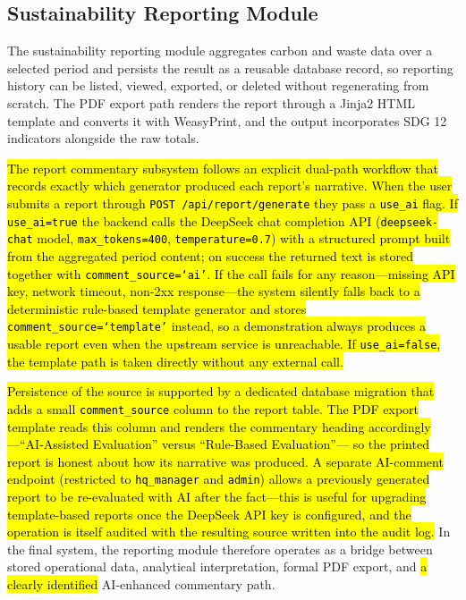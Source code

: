 \documentclass[11pt,a4paper]{article}
\newcommand{\new}[1]{\hl{#1}}
\begin{document}
\subsection{Sustainability Reporting Module}
The sustainability reporting module aggregates carbon and waste data over a selected period and persists the result as a reusable database record, so reporting history can be listed, viewed, exported, or deleted without regenerating from scratch. The PDF export path renders the report through a Jinja2 HTML template and converts it with WeasyPrint, and the output incorporates SDG 12 indicators alongside the raw totals.

\new{The report commentary subsystem follows an explicit dual-path workflow that records exactly which generator produced each report's narrative. When the user submits a report through \texttt{POST /api/report/generate} they pass a \texttt{use\_ai} flag. If \texttt{use\_ai=true} the backend calls the DeepSeek chat completion API (\texttt{deepseek-chat} model, \texttt{max\_tokens=400}, \texttt{temperature=0.7}) with a structured prompt built from the aggregated period content; on success the returned text is stored together with \texttt{comment\_source=`ai'}. If the call fails for any reason---missing API key, network timeout, non-2xx response---the system silently falls back to a deterministic rule-based template generator and stores \texttt{comment\_source=`template'} instead, so a demonstration always produces a usable report even when the upstream service is unreachable. If \texttt{use\_ai=false}, the template path is taken directly without any external call.}

\new{Persistence of the source is supported by a dedicated database migration that adds a small \texttt{comment\_source} column to the report table. The PDF export template reads this column and renders the commentary heading accordingly---``AI-Assisted Evaluation'' versus ``Rule-Based Evaluation''--- so the printed report is honest about how its narrative was produced. A separate AI-comment endpoint (restricted to \texttt{hq\_manager} and \texttt{admin}) allows a previously generated report to be re-evaluated with AI after the fact---this is useful for upgrading template-based reports once the DeepSeek API key is configured, and the operation is itself audited with the resulting source written into the audit log.} In the final system, the reporting module therefore operates as a bridge between stored operational data, analytical interpretation, formal PDF export, and \new{a clearly identified} AI-enhanced commentary path.
\end{document}
